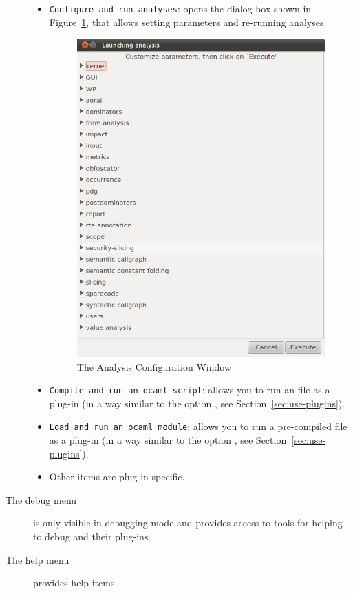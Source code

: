 \begin{description}
\begin{itemize}
\item \texttt{Configure and run analyses}: opens the dialog box shown in
  Figure~\ref{fig:launcher}, that allows setting \FramaC parameters and
  re-running analyses.
\begin{figure}[htbp!]
\begin{center}
\includegraphics [scale=0.5] {analysis-window.jpg}
\end{center}
\caption{The Analysis Configuration Window}
\label{fig:launcher}
\end{figure}
\item \texttt{Compile and run an ocaml script}: allows you to run an \caml
  file as a plug-in (in a way similar to the
  option , see Section~\ref{sec:use-plugins}).
\item \texttt{Load and run an ocaml module}: allows you to run a
  pre-compiled \caml file as a plug-in (in a
  way similar to the option , see
  Section~\ref{sec:use-plugins}).
\item Other items are plug-in specific.
\end{itemize}


\item [The debug menu] is only visible in debugging mode and provides access to
  tools for helping to debug \FramaC and their plug-ins.

\item [The help menu] provides help items.
\end{description}

